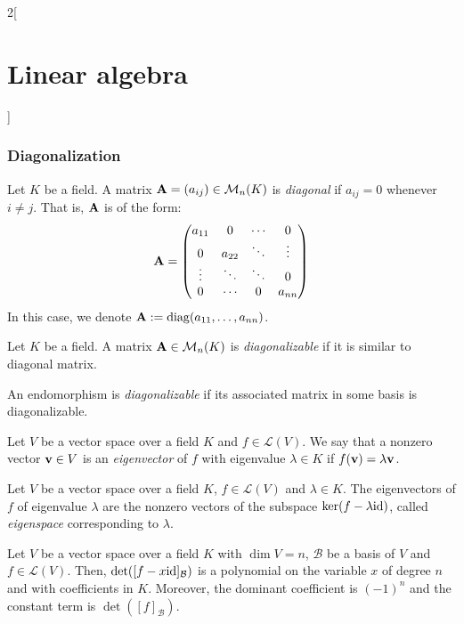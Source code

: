 \documentclass[../../../main_math.tex]{subfiles}
\begin{document}
\begin{multicols}{2}[\section{Linear algebra}]
  \subsubsection{Diagonalization}
  \begin{definition}
    Let $K$ be a field. A matrix $\boldsymbol{\mathrm{A}}=(a_{ij})\in\mathcal{M}_n(K)$ is \emph{diagonal} if $a_{ij}=0$ whenever $i\ne j$. That is, $\boldsymbol{\mathrm{A}}$ is of the form:
    $$\boldsymbol{\mathrm{A}}=
      \begin{pmatrix}
        a_{11} & 0      & \cdots & 0      \\
        0      & a_{22} & \ddots & \vdots \\
        \vdots & \ddots & \ddots & 0      \\
        0      & \cdots & 0      & a_{nn}
      \end{pmatrix}
    $$
    In this case, we denote $\boldsymbol{\mathrm{A}}:=\operatorname{diag}(a_{11},\ldots,a_{nn})$.
  \end{definition}
  \begin{definition}
    Let $K$ be a field. A matrix $\boldsymbol{\mathrm{A}}\in\mathcal{M}_n(K)$ is \emph{diagonalizable} if it is similar to diagonal matrix.
  \end{definition}
  \begin{definition}
    An endomorphism is \emph{diagonalizable} if its associated matrix in some basis is diagonalizable.
  \end{definition}
  \begin{definition}
    Let $V$ be a vector space over a field $K$ and $f\in\mathcal{L}(V)$. We say that a nonzero vector $\boldsymbol{\mathrm{v}}\in V$ is an \emph{eigenvector} of $f$ with eigenvalue $\lambda\in K$ if $f(\boldsymbol{\mathrm{v}})=\lambda \boldsymbol{\mathrm{v}}$.
  \end{definition}
  \begin{lemma}
    Let $V$ be a vector space over a field $K$, $f\in\mathcal{L}(V)$ and $\lambda\in K$. The eigenvectors of $f$ of eigenvalue $\lambda$ are the nonzero vectors of the subspace $\ker(f-\lambda\mathrm{id})$, called \emph{eigenspace} corresponding to $\lambda$.
  \end{lemma}
  \begin{lemma}
    Let $V$ be a vector space over a field $K$ with $\dim V=n$, $\mathcal{B}$ be a basis of $V$ and $f\in\mathcal{L}(V)$. Then, $\det([f-x\mathrm{id}]_\mathcal{B})$ is a polynomial on the variable $x$ of degree $n$ and with coefficients in $K$. Moreover, the dominant coefficient is $(-1)^n$ and the constant term is $\det([f]_\mathcal{B})$.
  \end{lemma}
  \begin{corollary}

\end{corollary}
\end{multicols}
\end{document}
